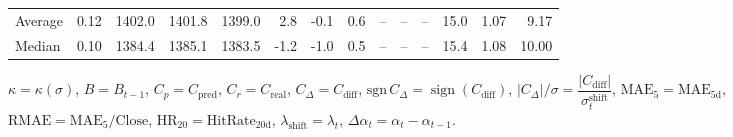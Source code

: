 \begin{threeparttable}
{\begin{tabular}{lrrrrrrrrrrrrr}
Average &     0.12 & 1402.0 & 1401.8 & 1399.0 &        2.8 &                     -0.1 &                 0.6 &         -- &        -- &             -- &             15.0 &            1.07 &                   9.17 \\
 Median &     0.10 & 1384.4 & 1385.1 & 1383.5 &       -1.2 &                     -1.0 &                 0.5 &         -- &        -- &             -- &             15.4 &            1.08 &                  10.00 \\
\bottomrule
\end{tabular}
}
\begin{tablenotes}\footnotesize
\item $\kappa=\kappa(\sigma)$, $B=B_{t-1}$, $C_p=C_{\text{pred}}$, $C_r=C_{\text{real}}$, $C_\Delta=C_{\text{diff}}$, $\mathrm{sgn}\,C_\Delta=\operatorname{sign}(C_{\text{diff}})$, $|C_\Delta|/\sigma=\dfrac{|C_{\text{diff}}|}{\sigma_t^{\text{shift}}}$, $\mathrm{MAE}_5=\mathrm{MAE}_{5\text{d}}$, $\mathrm{RMAE}= \mathrm{MAE}_5 / \text{Close}$, $\mathrm{HR}_{20}=\mathrm{HitRate}_{20\text{d}}$, 
$\lambda_{\text{shift}}=\lambda_t$, 
$\Delta\alpha_t=\alpha_t-\alpha_{t-1}$.
\end{tablenotes}
\end{threeparttable}
\endgroup

